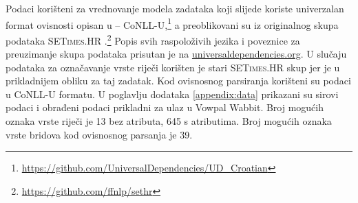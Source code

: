 Podaci korišteni za vrednovanje modela zadataka koji slijede koriste univerzalan
format ovisnosti  opisan u \citep{univdeps12} --
CoNLL-U,\footnote{\url{https://github.com/UniversalDependencies/UD_Croatian}} a
preoblikovani su iz originalnog skupa podataka \textsc{SETimes.HR}
\citep{agic2014setimes}.\footnote{\url{https://github.com/ffnlp/sethr}} Popis
svih raspoloživih jezika i poveznice za preuzimanje skupa podataka prisutan je
na \href{http://universaldependencies.org/}{universaldependencies.org}. U
slučaju podataka za označavanje vrste riječi korišten je stari
\textsc{SETimes.HR} skup jer je u prikladnijem obliku za taj zadatak. Kod
ovisnosnog parsiranja korišteni su podaci u CoNLL-U formatu. U poglavlju
dodataka \ref{appendix:data} prikazani su sirovi podaci i obrađeni podaci
prikladni za ulaz u Vowpal Wabbit. Broj mogućih oznaka vrste riječi je 13 bez
atributa, 645 s atributima. Broj mogućih oznaka vrste bridova kod ovisnosnog
parsanja je 39.
